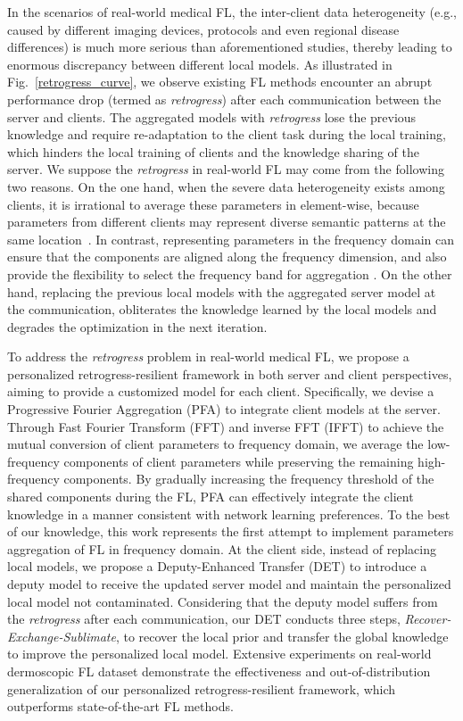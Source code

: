\documentclass[runningheads]{llncs}
\begin{document}
In the scenarios of real-world medical FL, the inter-client data heterogeneity (e.g., caused by different imaging devices, protocols and even regional disease differences) is much more serious than aforementioned studies, thereby leading to enormous discrepancy between different local models. As illustrated in Fig.~\ref{retrogress_curve}, we observe existing FL methods encounter an abrupt performance drop (termed as \textit{retrogress}) after each communication between the server and clients. The aggregated models with \textit{retrogress} lose the previous knowledge and require re-adaptation to the client task during the local training, which hinders the local training of clients and the knowledge sharing of the server. We suppose the \textit{retrogress} in real-world FL may come from the following two reasons. On the one hand, when the severe data heterogeneity exists among clients, it is irrational to average these parameters in element-wise, because parameters from different clients may represent diverse semantic patterns at the same location~\cite{fedma}. In contrast, representing parameters in the frequency domain can ensure that the components are aligned along the frequency dimension, and also provide the flexibility to select the frequency band for aggregation \cite{frequency_pruning}. On the other hand, replacing the previous local models with the aggregated server model at the communication, obliterates the knowledge learned by the local models and degrades the optimization in the next iteration.

To address the \textit{retrogress} problem in real-world medical FL, we propose a personalized retrogress-resilient framework in both server and client perspectives, aiming to provide a customized model for each client. Specifically, we devise a Progressive Fourier Aggregation (PFA) to integrate client models at the server. Through Fast Fourier Transform (FFT) and inverse FFT (IFFT) to achieve the mutual conversion of client parameters to frequency domain, we average the low-frequency components of client parameters while preserving the remaining high-frequency components. By gradually increasing the frequency threshold of the shared components during the FL, PFA can effectively integrate the client knowledge in a manner consistent with network learning preferences. To the best of our knowledge, this work represents the first attempt to implement parameters aggregation of FL in frequency domain. At the client side, instead of replacing local models, we propose a Deputy-Enhanced Transfer (DET) to introduce a deputy model to receive the updated server model and maintain the personalized local model not contaminated. Considering that the deputy model suffers from the \textit{retrogress} after each communication, our DET conducts three steps, \textit{Recover-Exchange-Sublimate}, to recover the local prior and transfer the global knowledge to improve the personalized local model. Extensive experiments on real-world dermoscopic FL dataset demonstrate the effectiveness and out-of-distribution generalization of our personalized retrogress-resilient framework, which outperforms state-of-the-art FL methods.
\end{document}
